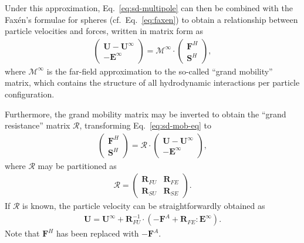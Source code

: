 Under this approximation, Eq.\ \eqref{eq:sd-multipole} can then be combined with the Fax\'{e}n's formulae for spheres (cf.\ Eq.\ \ref{eq:faxen}) to obtain a relationship between particle velocities and forces, written in matrix form as
\begin{equation} \label{eq:sd-mob-eq}
 \begin{aligned} 
  \begin{pmatrix}
   {\bm U}-{\bm U}^\infty \\
   -{\bm E}^\infty
  \end{pmatrix}
  = \mathscr{M^\infty} \cdot
  \begin{pmatrix}
   {\bm F}^H \\
   {\bm S}^H
  \end{pmatrix},
 \end{aligned}
\end{equation}
where $\mathscr{M}^\infty$ is the far-field approximation to the so-called ``grand mobility'' matrix, which contains the structure of all hydrodynamic interactions per particle configuration.

Furthermore, the grand mobility matrix may be inverted to obtain the ``grand resistance'' matrix $\mathscr{R}$, transforming Eq.\ \eqref{eq:sd-mob-eq} to
\begin{equation} 
 \begin{aligned} \label{eq:sd-hydro}
  \begin{pmatrix}
   {\bm F}^H \\
   {\bm S}^H
  \end{pmatrix}
  = \mathscr{R} \cdot
  \begin{pmatrix}
   {\bm U}-{\bm U}^\infty \\
   -{\bm E}^\infty
  \end{pmatrix},
 \end{aligned}
\end{equation}
where $\mathscr{R}$ may be partitioned as
\begin{equation} 
 \begin{aligned}
  \mathscr{R} =
  \begin{pmatrix}
   {\bm R}_{FU} & {\bm R}_{FE} \\
   {\bm R}_{SU} & {\bm R}_{SE}
  \end{pmatrix}.
 \end{aligned}
\end{equation} 
If $\mathscr{R}$ is known, the particle velocity can be straightforwardly obtained as
\begin{equation} \label{eq:sd-vel}
 \begin{aligned}
  \bm{U} =  \bm{U}^\infty + \bm{R}_{FU}^{-1} \cdot(-\bm{F}^A +\bm{R}_{FE}:\bm{E}^\infty).
 \end{aligned}
\end{equation}
Note that $\bm{F}^H$ has been replaced with $-\bm{F}^A$.


